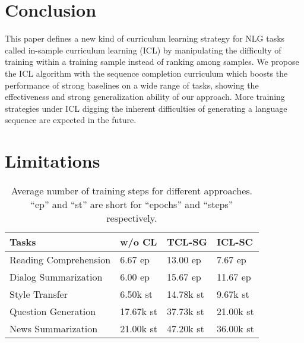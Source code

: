 \section{Conclusion}

This paper defines a new kind of curriculum learning strategy for NLG tasks called in-sample curriculum learning (ICL) by manipulating the difficulty of training within a training sample instead of ranking among samples. We propose the ICL algorithm with the sequence completion curriculum which boosts the performance of strong baselines on a wide range of tasks, showing the effectiveness and strong generalization ability of our approach. More training strategies under ICL digging the inherent difficulties of generating a language sequence are expected in the future.


\section*{Limitations}

\begin{table} [h]
	\scriptsize
	\centering
	\begin{tabular}{p{2.5cm}p{1cm}p{1cm}p{1cm}}
		\hline
		{Tasks} & {w/o CL} & {TCL-SG} & {ICL-SC} \\
		\hline
		Reading Comprehension  &6.67 ep & 13.00 ep & 7.67 ep \\
		Dialog Summarization &6.00 ep &15.67 ep & 11.67 ep\\
		Style Transfer &6.50k st & 14.78k st & 9.67k st  \\
		Question Generation & 17.67k st& 37.73k st  & 21.00k st  \\
		News Summarization &21.00k st  & 47.20k st &36.00k st\\
		
		\hline
	\end{tabular}
	\caption{Average number of training steps for different approaches. ``ep'' and ``st'' are short for ``epochs'' and ``steps'' respectively.}
	\label{tab:limitations}
\end{table}

